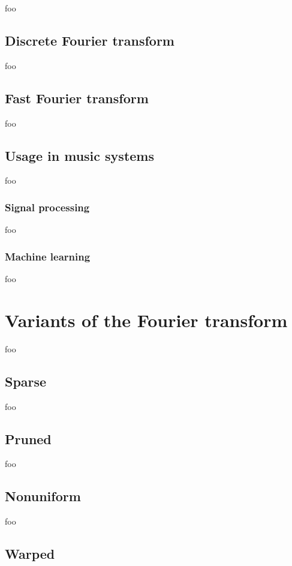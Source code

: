 \documentclass[letter,12pt]{article}
\begin{document}
foo

\subsection{Discrete Fourier transform}

foo

\subsection{Fast Fourier transform}

foo

\subsection{Usage in music systems}

foo

\subsubsection{Signal processing}

foo

\subsubsection{Machine learning}

foo

\section{Variants of the Fourier transform}
\label{sec:theory}

foo

\subsection{Sparse}

foo

\subsection{Pruned}

foo

\subsection{Nonuniform}

foo

\subsection{Warped}
\end{document}
